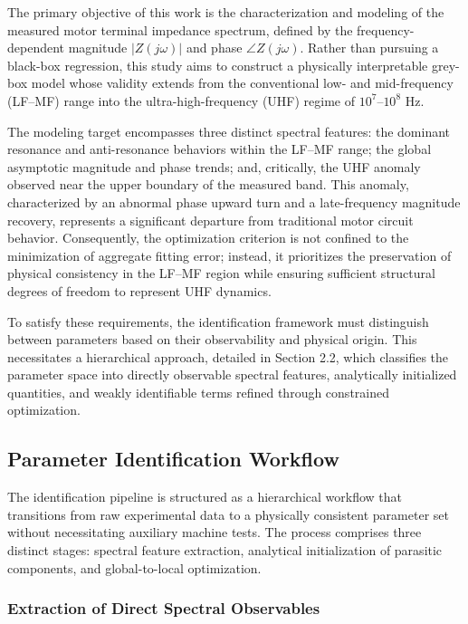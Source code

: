\documentclass[12pt,a4paper]{article}
\begin{document}
The primary objective of this work is the characterization and modeling of the measured motor terminal impedance spectrum, defined by the frequency-dependent magnitude $|Z(j\omega)|$ and phase $\angle Z(j\omega)$. Rather than pursuing a black-box regression, this study aims to construct a physically interpretable grey-box model whose validity extends from the conventional low- and mid-frequency (LF–MF) range into the ultra-high-frequency (UHF) regime of $10^7$–$10^8$ Hz\cite{ref12,ref13,ref16,ref20,ref21,ref23,ref40,ref52}.

The modeling target encompasses three distinct spectral features: the dominant resonance and anti-resonance behaviors within the LF–MF range; the global asymptotic magnitude and phase trends; and, critically, the UHF anomaly observed near the upper boundary of the measured band. This anomaly, characterized by an abnormal phase upward turn and a late-frequency magnitude recovery, represents a significant departure from traditional motor circuit behavior. Consequently, the optimization criterion is not confined to the minimization of aggregate fitting error; instead, it prioritizes the preservation of physical consistency in the LF–MF region while ensuring sufficient structural degrees of freedom to represent UHF dynamics\cite{ref1,ref7,ref34,ref36,ref53}.

To satisfy these requirements, the identification framework must distinguish between parameters based on their observability and physical origin. This necessitates a hierarchical approach, detailed in Section 2.2, which classifies the parameter space into directly observable spectral features, analytically initialized quantities, and weakly identifiable terms refined through constrained optimization.

\subsection{Parameter Identification Workflow}

The identification pipeline is structured as a hierarchical workflow that transitions from raw experimental data to a physically consistent parameter set without necessitating auxiliary machine tests. The process comprises three distinct stages: spectral feature extraction, analytical initialization of parasitic components, and global-to-local optimization\cite{ref12,ref13,ref16,ref20,ref21,ref23,ref40,ref45,ref52}.

\subsubsection{Extraction of Direct Spectral Observables}
\end{document}

